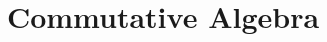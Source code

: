 \documentclass[12pt, oneside]{book}
\begin{document}
\frontmatter
\title{{\Huge{\textbf{Commutative Algebra}}}}
\maketitle
{}
\tableofcontents %


\mainmatter
{} %






\end{document}
